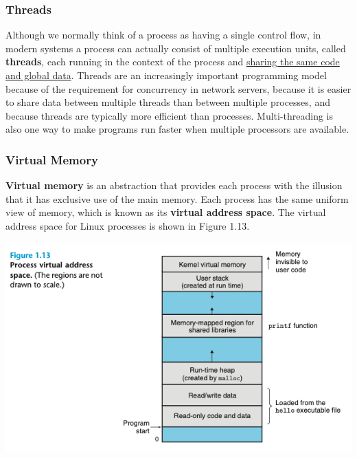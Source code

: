 \documentclass[11pt]{article}
\begin{document}
\subsubsection{Threads}
\label{sec:orgc939a02}
Although we normally think of a process as having a single control flow, in modern systems a process can actually consist of multiple execution units, called \textbf{threads}, each running in the context of the process and \uline{sharing the same code and global data}. Threads are an increasingly important programming model because of the requirement for concurrency in network servers, because it is easier to share data between multiple threads than between multiple processes, and because threads are typically more efficient than processes. Multi-threading is also one way to make programs run faster when multiple processors are available.\\

\subsubsection{Virtual Memory}
\label{sec:org24c2bd1}
\textbf{Virtual memory} is an abstraction that provides each process with the illusion that it has exclusive use of the main memory. Each process has the same uniform view of memory, which is known as its \textbf{virtual address space}. The virtual address space for Linux processes is shown in Figure 1.13.\\

\begin{center}
\includegraphics[width=.9\linewidth]{pics/process-virtual-address-space.png}
\end{center}
\end{document}
